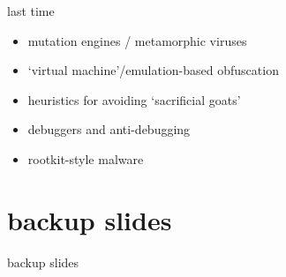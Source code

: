 \date{}
\title{}
\date{}

\begin{frame}
    \titlepage
\end{frame}


\usetikzlibrary{arrows.meta}

\begin{frame}{last time}
    \begin{itemize}
    \item mutation engines / metamorphic viruses
    \item `virtual machine'/emulation-based obfuscation
    \item heuristics for avoiding `sacrificial goats'
    \item debuggers and anti-debugging
    \item rootkit-style malware
    \end{itemize}
\end{frame}






\section{backup slides}
\begin{frame}{backup slides}
\end{frame}




